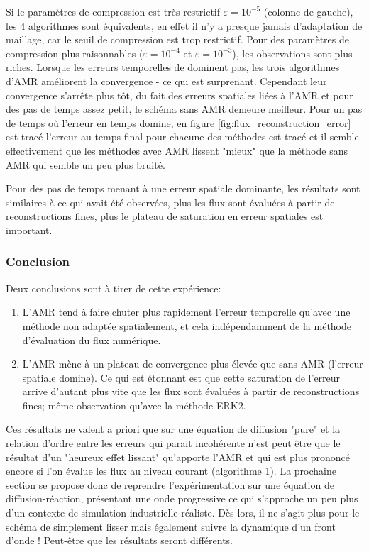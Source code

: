     Si le paramètres de compression est très restrictif $\varepsilon = 10^{-5}$ (colonne de gauche), les 4 algorithmes sont équivalents, en effet il n'y a presque jamais d'adaptation de maillage, car le seuil de compression est trop restrictif.
    Pour des paramètres de compression plus raisonnables ($\varepsilon = 10^{-4}$ et $\varepsilon = 10^{-3}$), les observations sont plus riches.
    Lorsque les erreurs temporelles de dominent pas, les trois algorithmes d'AMR améliorent la convergence - ce qui est surprenant. Cependant leur convergence s'arrête plus tôt, du fait des 
    erreurs spatiales liées à l'AMR et pour des pas de temps assez petit, le schéma sans AMR demeure meilleur. Pour un pas de temps où l'erreur en temps domine, 
    en figure \ref{fig:flux_reconstruction_error} est tracé l'erreur au temps final pour chacune des méthodes est tracé et il semble effectivement que les méthodes avec AMR lissent
    "mieux" que la méthode sans AMR qui semble un peu plus bruité. 


    Pour des pas de temps menant à une erreur spatiale dominante, les résultats sont similaires à ce qui avait été observées, plus les flux sont évaluées à partir de reconstructions fines, 
    plus le plateau de saturation en erreur spatiales est important.
    \subsubsection{Conclusion}
    Deux conclusions sont à tirer de cette expérience:
    \begin{enumerate}
        \item L'AMR tend à faire chuter plus rapidement l'erreur temporelle qu'avec une méthode non adaptée spatialement, et cela indépendamment de la méthode d'évaluation du flux numérique.
        \item L'AMR mène à un plateau de convergence plus élevée que sans AMR (l'erreur spatiale domine). Ce qui est étonnant est que cette saturation de l'erreur arrive d'autant plus vite que les flux sont évaluées à partir de reconstructions fines; même observation qu'avec la méthode ERK2.
    \end{enumerate}
    Ces résultats ne valent a priori que sur une équation de diffusion "pure" et la relation d'ordre entre les erreurs qui parait incohérente n'est peut être que le résultat d'un 
    "heureux effet lissant" qu'apporte l'AMR et qui est plus prononcé encore si l'on évalue les flux au niveau courant (algorithme 1).
    La prochaine section se propose donc de reprendre l'expérimentation sur une équation de diffusion-réaction, présentant une onde progressive ce qui s'approche un peu plus
    d'un contexte de simulation industrielle réaliste.
    Dès lors, il ne s'agit plus pour le schéma de simplement lisser mais également suivre la dynamique d'un front d'onde ! Peut-être que les résultats seront différents.
